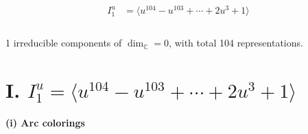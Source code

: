 \documentclass[1p]{elsarticle_modified}
\theoremstyle{definition}
\begin{document}
\begin{align*}
I^u_{1}&=\langle 
u^{104}- u^{103}+\cdots+2 u^3+1\rangle \\
\\
\end{align*}
\raggedright * 1 irreducible components of $\dim_{\mathbb{C}}=0$, with total 104 representations.\\
\newpage
\renewcommand{\arraystretch}{1}
\centering \section*{I. $I^u_{1}= \langle u^{104}- u^{103}+\cdots+2 u^3+1 \rangle$}
\flushleft \textbf{(i) Arc colorings}\\
\end{document}
